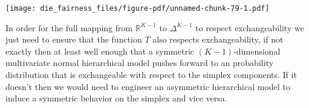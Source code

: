 \documentclass[
  letterpaper,
  DIV=11,
  numbers=noendperiod]{scrartcl}
\newenvironment{Shaded}{\begin{snugshade}}{\end{snugshade}}
\newcommand{\AttributeTok}[1]{\textcolor[rgb]{0.40,0.45,0.13}{#1}}
\newcommand{\ControlFlowTok}[1]{\textcolor[rgb]{0.00,0.23,0.31}{#1}}
\newcommand{\DecValTok}[1]{\textcolor[rgb]{0.68,0.00,0.00}{#1}}
\newcommand{\FloatTok}[1]{\textcolor[rgb]{0.68,0.00,0.00}{#1}}
\newcommand{\FunctionTok}[1]{\textcolor[rgb]{0.28,0.35,0.67}{#1}}
\newcommand{\NormalTok}[1]{\textcolor[rgb]{0.00,0.23,0.31}{#1}}
\newcommand{\OtherTok}[1]{\textcolor[rgb]{0.00,0.23,0.31}{#1}}
\newcommand{\SpecialCharTok}[1]{\textcolor[rgb]{0.37,0.37,0.37}{#1}}
\newcommand{\StringTok}[1]{\textcolor[rgb]{0.13,0.47,0.30}{#1}}
\begin{document}
\begin{Shaded}
\end{Shaded}

\texttt{[image: die\_fairness\_files/figure-pdf/unnamed-chunk-79-1.pdf]}

In order for the full mapping from \(\mathbb{R}^{K - 1}\) to
\(\Delta^{K - 1}\) to respect exchangeability we just need to ensure
that the function \(T\) also respects exchangeability, if not exactly
then at least well enough that a symmetric \((K - 1)\)-dimensional
multivariate normal hierarchical model pushes forward to an probability
distribution that is exchangeable with respect to the simplex
components. If it doesn't then we would need to engineer an asymmetric
hierarchical model to induce a symmetric behavior on the simplex and
vice versa.
\end{document}
